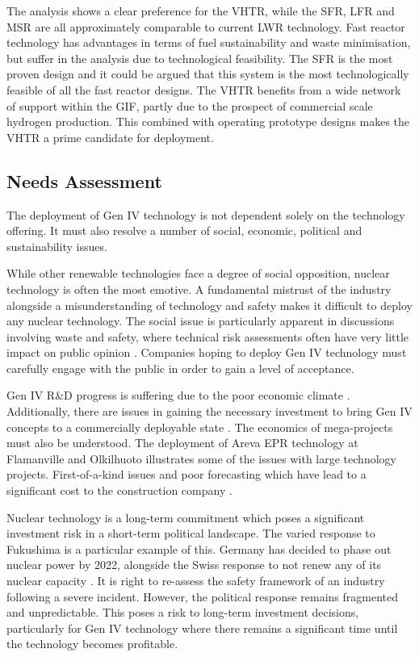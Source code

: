 \documentclass[journal]{IEEEtran}
\begin{document}
The analysis shows a clear preference for the VHTR, while the SFR, LFR and MSR are all approximately comparable to current LWR technology.
Fast reactor technology has advantages in terms of fuel sustainability and waste minimisation, but suffer in the analysis due to technological feasibility.
The SFR is the most proven design and it could be argued that this system is the most technologically feasible of all the fast reactor designs.
The VHTR benefits from a wide network of support within the GIF, partly due to the prospect of commercial scale hydrogen production.
This combined with operating prototype designs makes the VHTR a prime candidate for deployment.

\subsection{Needs Assessment}
The deployment of Gen IV technology is not dependent solely on the technology offering.
It must also resolve a number of social, economic, political and sustainability issues.

While other renewable technologies face a degree of social opposition, nuclear technology is often the most emotive.
A fundamental mistrust of the industry alongside a misunderstanding of technology and safety makes it difficult to deploy any nuclear technology.
The social issue is particularly apparent in discussions involving waste and safety, where technical risk assessments often have very little impact on public opinion \cite{Marques2010a}.
Companies hoping to deploy Gen IV technology must carefully engage with the public in order to gain a level of acceptance.

Gen IV R\&D progress is suffering due to the poor economic climate \cite{nnl}.
Additionally, there are issues in gaining the necessary investment to bring Gen IV concepts to a commercially deployable state \cite{Bhatnagar2011}.
The economics of mega-projects must also be understood.
The deployment of Areva EPR technology at Flamanville and Olkilhuoto illustrates some of the issues with large technology projects.
First-of-a-kind issues and poor forecasting which have lead to a significant cost to the construction company \cite{Locatelli2013}.

Nuclear technology is a long-term commitment which poses a significant investment risk in a short-term political landscape.
The varied response to Fukushima is a particular example of this.
Germany has decided to phase out nuclear power by 2022, alongside the Swiss response to not renew any of its nuclear capacity \cite{schneider2012nuclear}.
It is right to re-assess the safety framework of an industry following a severe incident.
However, the political response remains fragmented and unpredictable.
This poses a risk to long-term investment decisions, particularly for Gen IV technology where there remains a significant time until the technology becomes profitable.
\end{document}
